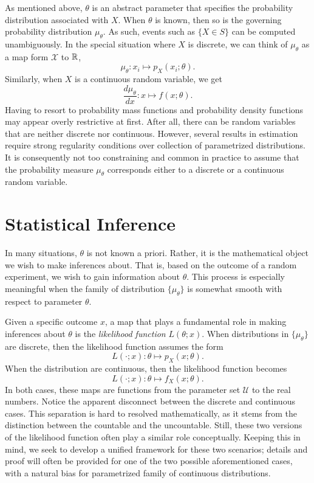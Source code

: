 As mentioned above, $\theta$ is an abstract parameter that specifies the probability distribution associated with $X$.
When $\theta$ is known, then so is the governing probability distribution $\mu_{\theta}$.
As such, events such as $\{ X \in S \}$ can be computed unambiguously.
In the special situation where $X$ is discrete, we can think of $\mu_{\theta}$ as a map form $\mathcal{X}$ to $\mathbb{R}$,
\begin{equation*}
\mu_{\theta} : x_i \mapsto p_X (x_i; \theta) .
\end{equation*}
Similarly, when $X$ is a continuous random variable, we get
\begin{equation*}
\frac{d \mu_{\theta}}{dx} : x \mapsto f(x; \theta) .
\end{equation*}
Having to resort to probability mass functions and probability density functions may appear overly restrictive at first.
After all, there can be random variables that are neither discrete nor continuous.
However, several results in estimation require strong regularity conditions over collection of parametrized distributions.
It is consequently not too constraining and common in practice to assume that the probability measure $\mu_{\theta}$ corresponds either to a discrete or a continuous random variable.


\section{Statistical Inference}

In many situations, $\theta$ is not known a priori.
Rather, it is the mathematical object we wish to make inferences about.
That is, based on the outcome of a random experiment, we wish to gain information about $\theta$.
This process is especially meaningful when the family of distribution $\{ \mu_{\theta} \}$ is somewhat smooth with respect to parameter  $\theta$.

Given a specific outcome $x$, a map that plays a fundamental role in making inferences about $\theta$ is the \emph{likelihood function} $L(\theta; x)$.
When distributions in $\{ \mu_{\theta} \}$ are discrete, then the likelihood function assumes the form
\begin{equation*}
L(\cdot ; x) : \theta \mapsto p_X(x ; \theta) .
\end{equation*}
When the distribution are continuous, then the likelihood function becomes
\begin{equation*}
L(\cdot ; x) : \theta \mapsto f_X(x ; \theta) .
\end{equation*}
In both cases, these maps are functions from the parameter set $\mathcal{U}$ to the real numbers.
Notice the apparent disconnect between the discrete and continuous cases.
This separation is hard to resolved mathematically, as it stems from the distinction between the countable and the uncountable.
Still, these two versions of the likelihood function often play a similar role conceptually.
Keeping this in mind, we seek to develop a unified framework for these two scenarios; details and proof will often be provided for one of the two possible aforementioned cases, with a natural bias for parametrized family of continuous distributions.

